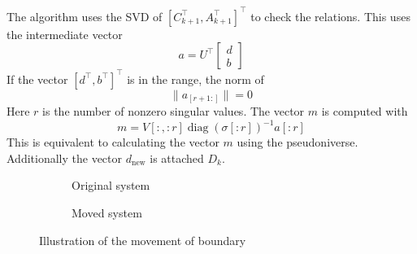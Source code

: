 \documentclass[doctype=mastersthesis,BCOR=15mm,biblatex]{ldvbook}%
\DeclareMathOperator{\diag}{diag}
\begin{document}
The algorithm uses the SVD of $[C_{k+1}^\top,A_{k+1}^\top]^\top$ to check the relations.
This uses the intermediate vector 
\begin{equation}
	a = U^\top 	
	\begin{bmatrix}
	d\\b
	\end{bmatrix}
\end{equation} 
If the vector $[d^\top,b^\top]^\top$ is in the range, the norm of 
\begin{equation}
	\|a_{[r+1:]} \| = 0
\end{equation}
Here $r$ is the number of nonzero singular values.
The vector $m$ is computed with 
\begin{equation}
	m = V[:,:r] \diag(\sigma[:r])^{-1} a[:r]
\end{equation}
This is equivalent to calculating the vector $m$ using the pseudoniverse.  
Additionally the vector $d_\text{new}$ is attached $D_k$.
\begin{figure}[htb]
	\centering
	
	\begin{subfigure}[b]{0.45\textwidth}
		\caption{Original system}
		\label{fig:move_right_a}
	\end{subfigure}
	\hspace{0.8cm}
	\begin{subfigure}[b]{0.45\textwidth}
		\caption{Moved system}
		\label{fig:move_right_b}
	\end{subfigure}
	\caption{Illustration of the movement of boundary}
	\label{fig:move_right}
\end{figure}
\end{document}
